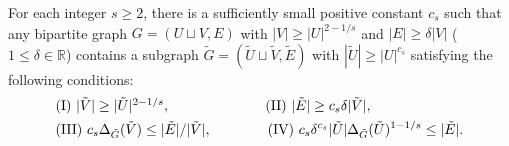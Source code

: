 \documentclass[10pt,a4paper]{amsart}
\begin{document}
\begin{lemma}\label{biregular}
    For each integer $s \geq 2$, there is a sufficiently small positive constant $c_s$ such that any bipartite graph $G=(U \sqcup V,E)$ with $|V| \geq |U|^{2-1/s}$ and $|E|\geq \delta|V|$ ($1 \leq \delta \in \mathbb{R}$) contains a subgraph $\tilde{G} = (\tilde{U} \sqcup \tilde{V}, \tilde{E})$ with $|\tilde{U}| \geq |U|^{c_s}$ satisfying the following conditions: \begin{align*}
        &\makebox[0pt][l]{$\text{(I)}~|\tilde{V}| \geq |\tilde{U}|^{2-1/s},$}\phantom{\text{(III)}~c_s \Delta_{\tilde{G}}(\tilde{V}) \leq |\tilde{E}|/|\tilde{V}|,}
        \qquad\qquad \text{(II)}~|\tilde{E}|\geq c_s \delta|\tilde{V}|,\\
        &\text{(III)}~c_s \Delta_{\tilde{G}}(\tilde{V}) \leq |\tilde{E}|/|\tilde{V}|,
        \qquad\qquad \text{(IV)}~c_s \delta^{c_s} |\tilde{U}|\Delta_{\tilde{G}}(\tilde{U})^{1- 1/s} \leq |\tilde{E}|.
    \end{align*}
\end{lemma}
\end{document}
